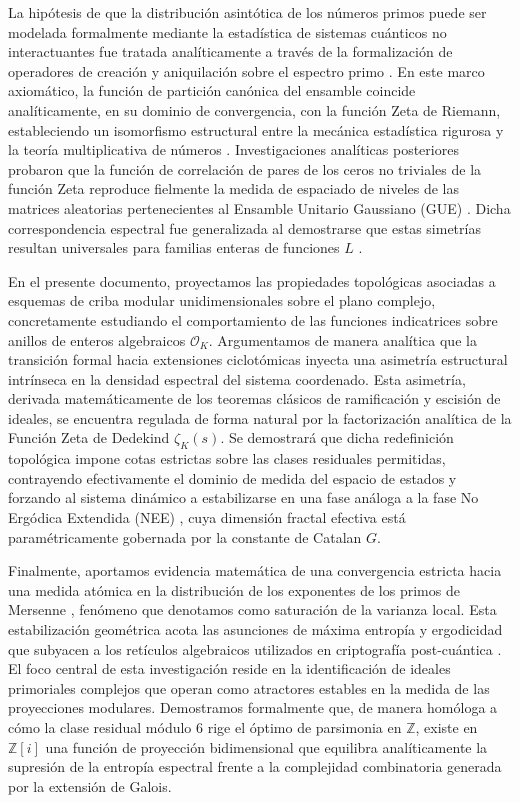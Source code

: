 \documentclass{article}
\numberwithin{equation}{section}
\theoremstyle{plain}
\theoremstyle{definition}
\begin{document}
La hipótesis de que la distribución asintótica de los números primos puede ser modelada formalmente mediante la estadística de sistemas cuánticos no interactuantes fue tratada analíticamente a través de la formalización de operadores de creación y aniquilación sobre el espectro primo \cite{Julia1990}. En este marco axiomático, la función de partición canónica del ensamble coincide analíticamente, en su dominio de convergencia, con la función Zeta de Riemann, estableciendo un isomorfismo estructural entre la mecánica estadística rigurosa y la teoría multiplicativa de números \cite{Spector1990}. Investigaciones analíticas posteriores probaron que la función de correlación de pares de los ceros no triviales de la función Zeta reproduce fielmente la medida de espaciado de niveles de las matrices aleatorias pertenecientes al Ensamble Unitario Gaussiano (GUE) \cite{Montgomery1973}. Dicha correspondencia espectral fue generalizada al demostrarse que estas simetrías resultan universales para familias enteras de funciones $L$ \cite{KatzSarnak1999, BerryKeating1999}.

En el presente documento, proyectamos las propiedades topológicas asociadas a esquemas de criba modular unidimensionales sobre el plano complejo, concretamente estudiando el comportamiento de las funciones indicatrices sobre anillos de enteros algebraicos $\mathcal{O}_K$. Argumentamos de manera analítica que la transición formal hacia extensiones ciclotómicas inyecta una asimetría estructural intrínseca en la densidad espectral del sistema coordenado. Esta asimetría, derivada matemáticamente de los teoremas clásicos de ramificación y escisión de ideales, se encuentra regulada de forma natural por la factorización analítica de la Función Zeta de Dedekind $\zeta_K(s)$. Se demostrará que dicha redefinición topológica impone cotas estrictas sobre las clases residuales permitidas, contrayendo efectivamente el dominio de medida del espacio de estados y forzando al sistema dinámico a estabilizarse en una fase análoga a la fase No Ergódica Extendida (NEE) \cite{Kravtsov2015, Khaymovich2021}, cuya dimensión fractal efectiva está paramétricamente gobernada por la constante de Catalan $G$.

Finalmente, aportamos evidencia matemática de una convergencia estricta hacia una medida atómica en la distribución de los exponentes de los primos de Mersenne \cite{Bourne2021}, fenómeno que denotamos como saturación de la varianza local. Esta estabilización geométrica acota las asunciones de máxima entropía y ergodicidad que subyacen a los retículos algebraicos utilizados en criptografía post-cuántica \cite{Wenger2024, Peikert2009}. El foco central de esta investigación reside en la identificación de ideales primoriales complejos que operan como atractores estables en la medida de las proyecciones modulares. Demostramos formalmente que, de manera homóloga a cómo la clase residual módulo $6$ rige el óptimo de parsimonia en $\mathbb{Z}$, existe en $\mathbb{Z}[i]$ una función de proyección bidimensional que equilibra analíticamente la supresión de la entropía espectral frente a la complejidad combinatoria generada por la extensión de Galois.
\end{document}
